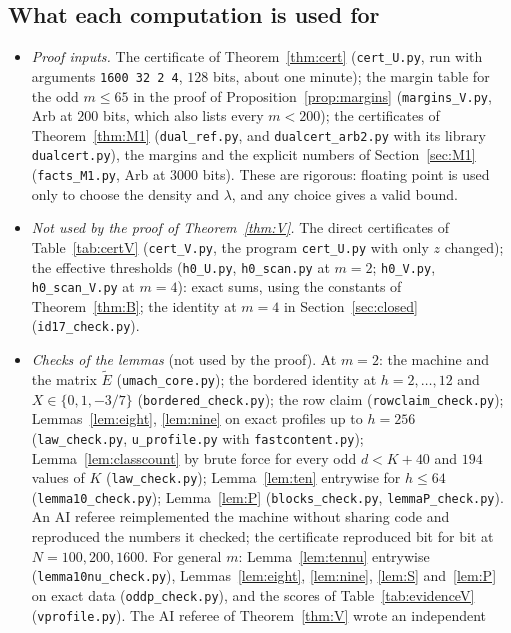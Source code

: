 \documentclass[11pt]{amsart}
\theoremstyle{definition}
\theoremstyle{remark}
\numberwithin{equation}{section}
\begin{document}
\subsection{What each computation is used for}
\begin{itemize}
\item \emph{Proof inputs.} The certificate of Theorem~\ref{thm:cert} (\texttt{cert\_U.py}, run with arguments
  \texttt{1600 32 2 4}, $128$ bits, about one minute); the margin table for the odd $m\le65$ in the proof of
  Proposition~\ref{prop:margins} (\texttt{margins\_V.py}, Arb at $200$ bits, which also lists every $m<200$); the
  certificates of Theorem~\ref{thm:M1} (\texttt{dual\_ref.py}, and \texttt{dualcert\_arb2.py} with its library
  \texttt{dualcert.py}), the margins and the explicit numbers of Section~\ref{sec:M1} (\texttt{facts\_M1.py}, Arb at
  $3000$ bits). These are rigorous: floating point is used only to choose the density and $\lambda$, and any choice gives
  a valid bound.
\item \emph{Not used by the proof of Theorem~\ref{thm:V}.} The direct certificates of Table~\ref{tab:certV}
  (\texttt{cert\_V.py}, the program \texttt{cert\_U.py} with only $z$ changed); the effective thresholds
  (\texttt{h0\_U.py}, \texttt{h0\_scan.py} at $m=2$; \texttt{h0\_V.py}, \texttt{h0\_scan\_V.py} at $m=4$): exact sums,
  using the constants of Theorem~\ref{thm:B}; the identity at $m=4$ in Section~\ref{sec:closed}
  (\texttt{id17\_check.py}).
\item \emph{Checks of the lemmas} (not used by the proof). At $m=2$: the machine and the matrix $\tilde E$
  (\texttt{umach\_core.py}); the bordered identity at $h=2,\dots,12$ and $X\in\{0,1,-3/7\}$ (\texttt{bordered\_check.py});
  the row claim (\texttt{rowclaim\_check.py}); Lemmas~\ref{lem:eight}, \ref{lem:nine} on exact profiles up to $h=256$
  (\texttt{law\_check.py}, \texttt{u\_profile.py} with \texttt{fastcontent.py}); Lemma~\ref{lem:classcount} by brute
  force for every odd $d<K+40$ and $194$ values of $K$ (\texttt{law\_check.py}); Lemma~\ref{lem:ten} entrywise for $h\le64$
  (\texttt{lemma10\_check.py}); Lemma~\ref{lem:P} (\texttt{blocks\_check.py}, \texttt{lemmaP\_check.py}). An AI referee
  reimplemented the machine without sharing code and reproduced the numbers it checked; the certificate reproduced bit for
  bit at $N=100,200,1600$. For general $m$: Lemma~\ref{lem:tennu} entrywise (\texttt{lemma10nu\_check.py}),
  Lemmas~\ref{lem:eight}, \ref{lem:nine}, \ref{lem:S} and~\ref{lem:P} on exact data (\texttt{oddp\_check.py}), and the
  scores of Table~\ref{tab:evidenceV} (\texttt{vprofile.py}). The AI referee of Theorem~\ref{thm:V} wrote an independent

\end{itemize}
\end{document}
